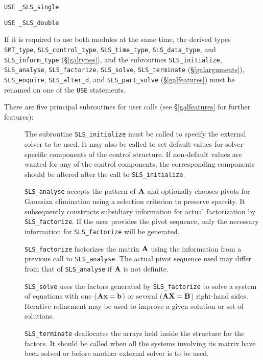 \documentclass{galahad}
\newcommand{\packagename}{SLS}
\newcommand{\fullpackagename}{\libraryname\_\-\packagename}
\begin{document}
\medskip{}

\hskip0.5in {\tt USE \fullpackagename\_single}

\medskip{}

\hskip0.5in {\tt USE  \fullpackagename\_double}

\medskip

If it is required to use both modules at the same time, the derived types
{\tt SMT\_type},
{\tt \packagename\_control\_type},
{\tt \packagename\_time\-\_type},
{\tt \packagename\_data\-\_type}, and
{\tt \packagename\_inform\_type}
(\S\ref{galtypes}),
and the subroutines
{\tt \packagename\_initialize},
{\tt \packagename\_analyse},
{\tt \packagename\-\_factorize},
{\tt \packagename\_solve},
{\tt \packagename\_terminate}
(\S\ref{galarguments}),
{\tt \packagename\_enquire},
{\tt \packagename\_alter\_d}, and
{\tt \packagename\_part\_solve}
(\S\ref{galfeatures})
must be renamed on one of the {\tt USE} statements.

\noindent There are five principal subroutines for user calls (see
\S\ref{galfeatures} for further features):

\begin{description}

\item[] The subroutine {\tt \packagename\_initialize} must be called to
specify the external solver to be used.
It may also be called to set default values
for solver-specific components of the control structure.
If non-default values are
wanted for any of the control components, the corresponding components
should be altered after the call to {\tt \packagename\_initialize}.

\item[] {\tt \packagename\_analyse} accepts the pattern of ${\mathbf{A}}$
 and optionally chooses pivots
 for Gaussian elimination using a selection criterion to preserve
 sparsity.  It subsequently constructs subsidiary information for
 actual factorization by {\tt \packagename\_factorize}. If the user provides
 the pivot sequence, only the necessary information for
 {\tt \packagename\_factorize} will be generated.

\item[] {\tt \packagename\_factorize} factorizes the matrix ${\mathbf{A}}$ using the
 information
 from a previous call to {\tt \packagename\_analyse}. The actual pivot sequence
 used may differ from that of {\tt \packagename\_analyse} if ${\mathbf{A}}$ is not
definite.

\item[] {\tt \packagename\_solve} uses the factors generated by
  {\tt \packagename\_factorize} to
  solve a system of equations with one (${\mathbf{A}} {\mathbf{x}} = {\mathbf{b}}$)
  or several (${\mathbf{A}} {\mathbf{X}} = {\mathbf{B}}$) right-hand sides.
  Iterative refinement may be used to improve a given solution
  or set of solutions.

\item[] {\tt \packagename\_terminate} deallocates the arrays held inside the
  structure for the factors. It should be called
  when all the systems involving its matrix have been solved
  or before another external solver is to be used.
\end{description}
\end{document}
